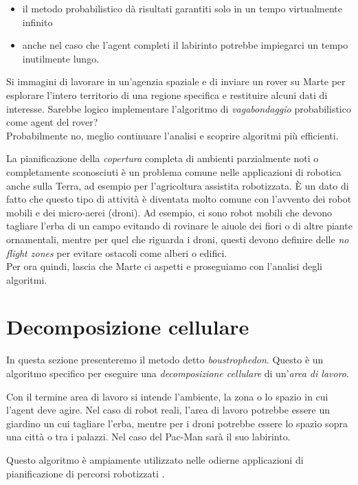 \documentclass[8pt]{book}
\begin{document}
\begin{itemize}
\item
  il metodo probabilistico d\`a risultati garantiti solo in un tempo virtualmente infinito
\item
  anche nel caso che l'agent completi il labirinto potrebbe impiegarci un tempo inutilmente lungo.
\end{itemize}

Si immagini di lavorare in un'agenzia spaziale e di inviare un rover su Marte per esplorare l'intero territorio di una regione specifica e restituire alcuni dati di interesse. Sarebbe logico implementare l'algoritmo di \emph{vagabondaggio} probabilistico come agent del rover?\\
Probabilmente no, meglio continuare l'analisi e scoprire algoritmi più efficienti.

La pianificazione della \emph{copertura} completa di ambienti parzialmente noti o completamente sconosciuti è un problema comune nelle applicazioni di robotica anche sulla Terra, ad esempio per l'agricoltura assistita robotizzata. È un dato di fatto che questo tipo di attività è diventata molto comune con l'avvento dei robot mobili e dei micro-aerei (droni). Ad esempio, ci sono robot mobili che devono tagliare l'erba di un campo evitando di rovinare le aiuole dei fiori o di altre piante ornamentali, mentre per quel che riguarda i droni, questi devono definire delle \emph{no flight zones} per evitare ostacoli come alberi o edifici.\\
Per ora quindi, lascia che Marte ci aspetti e proseguiamo con l'analisi degli algoritmi.

\section{Decomposizione cellulare}

In questa sezione presenteremo il metodo detto \emph{boustrophedon}. Questo è un algoritmo specifico per eseguire una \emph{decomposizione cellulare} di un'\emph{area di lavoro}.

Con il termine area di lavoro si intende l'ambiente, la zona o lo spazio in cui l'agent deve agire. Nel caso di robot reali, l'area di lavoro potrebbe essere un giardino un cui tagliare l'erba, mentre per i droni potrebbe essere lo spazio sopra una città o tra i palazzi. Nel caso del Pac-Man sarà il suo labirinto.

Questo algoritmo è ampiamente utilizzato nelle odierne applicazioni di pianificazione di percorsi robotizzati \cite{Bahnemann}.
\end{document}
